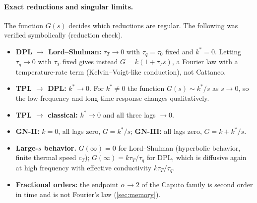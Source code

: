 \paragraph{Exact reductions and singular limits.} The function $G(s)$ decides which reductions are regular. The following was verified symbolically (reduction check).
\begin{itemize}
\item \textbf{DPL $\to$ Lord--Shulman:} $\tau_T\to0$ with $\tau_q=\tau_0$ fixed and $k^*=0$. Letting $\tau_q\to0$ with $\tau_T$ fixed gives instead $G=k(1+\tau_Ts)$, a Fourier law with a temperature-rate term (Kelvin--Voigt-like conduction), not Cattaneo.
\item \textbf{TPL $\to$ DPL:} $k^*\to0$. For $k^*\ne0$ the function $G(s)\sim k^*/s$ as $s\to0$, so the low-frequency and long-time response changes qualitatively.
\item \textbf{TPL $\to$ classical:} $k^*\to0$ and all three lags $\to0$.
\item \textbf{GN-II:} $k=0$, all lags zero, $G=k^*/s$; \textbf{GN-III:} all lags zero, $G=k+k^*/s$.
\item \textbf{Large-$s$ behavior.} $G(\infty)=0$ for Lord--Shulman (hyperbolic behavior, finite thermal speed $c_T$); $G(\infty)=k\tau_T/\tau_q$ for DPL, which is diffusive again at high frequency with effective conductivity $k\tau_T/\tau_q$.
\item \textbf{Fractional orders:} the endpoint $\alpha\to2$ of the Caputo family is second order in time and is not Fourier's law (\cref{sec:memory}).
\end{itemize}

